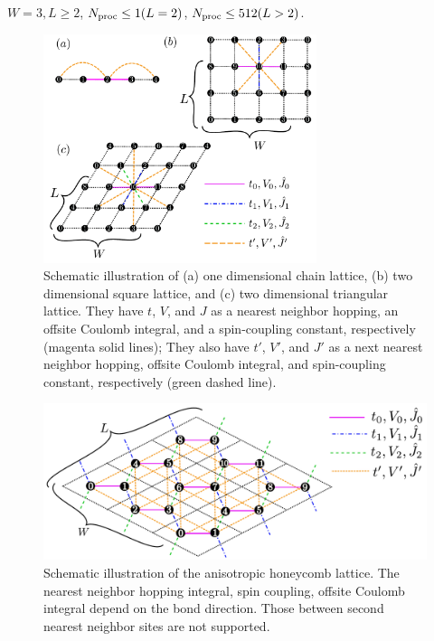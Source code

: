 \begin{itemize}
\begin{itemize}
    $W=3, L \geq 2$, $N_{\rm proc} \leq 1(L=2)$, $N_{\rm proc} \leq 512(L>2)$.

\end{itemize}

\begin{figure}[!tbhp]
  \begin{center}
    \includegraphics[width=8cm]{../figs/chap04_1_lattice.pdf}
    \caption{Schematic illustration of
      (a) one dimensional chain lattice, 
      (b) two dimensional square lattice, and 
      (c) two dimensional triangular lattice.
      They have $t$, $V$, and $J$ as a nearest neighbor hopping, an offsite Coulomb integral, 
      and a spin-coupling constant, respectively (magenta solid lines);
      They also have $t'$, $V'$, and $J'$ as a next nearest neighbor hopping, offsite Coulomb integral, 
      and spin-coupling constant, respectively (green dashed line).
    }
    \label{fig_chap04_1_lattice}
  \end{center}
\end{figure}

\begin{figure}[!tbhp]
  \begin{center}
    \includegraphics[width=15cm]{../figs/chap04_1_honeycomb.pdf}
    \caption{Schematic illustration of the anisotropic honeycomb lattice.
      The nearest neighbor 
      hopping integral, spin coupling, offsite Coulomb integral
      depend on the bond direction.
      Those between second nearest neighbor sites are not supported.
    }
    \label{fig_chap04_1_honeycomb}
  \end{center}
\end{figure}


\end{itemize}
